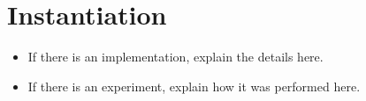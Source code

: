 \section{Instantiation}\label{sec:instantiation}

\begin{itemize}
  \item If there is an implementation, explain the details here.
  \item If there is an experiment, explain how it was performed here.
\end{itemize}
